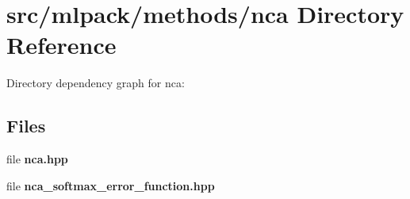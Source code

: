 \section{src/mlpack/methods/nca Directory Reference}
\label{dir_19aeae75fcb7fc45f130d29cd1a421e5}
Directory dependency graph for nca\-:
\subsection*{Files}
\begin{DoxyCompactItemize}
\item 
file {\bf nca.\-hpp}
\item 
file {\bf nca\-\_\-softmax\-\_\-error\-\_\-function.\-hpp}
\end{DoxyCompactItemize}
